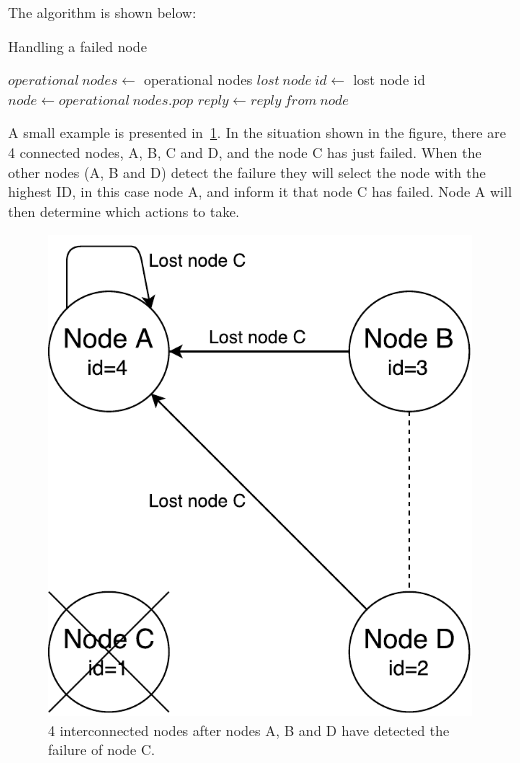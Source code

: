 \documentclass{cslthse-msc}
\begin{document}
The algorithm is shown below:

\begin{algorithm}[!h]	%
	\caption{Handling a failed node} \label{alg:node_failure}
	\begin{algorithmic}[1]
	\State $operational\ nodes\gets $ operational nodes
	\State $lost\ node\ id\gets $ lost node id
	\State
	\Do
		\State $node\gets operational\ nodes.pop$
		\State
		\State $reply\gets reply\ from\ node$
	\end{algorithmic}
\end{algorithm}

A small example is presented in~\cref{fig:handling_node_failure}. In the situation shown in the figure, there are 4 connected nodes, A, B, C and D, and the node C has just failed. When the other nodes (A, B and D) detect the failure they will select the node with the highest ID, in this case node A, and inform it that node C has failed. Node A will then determine which actions to take.

\begin{figure}[!hbt]
\centering
\includegraphics[scale=0.5]{images/handling_node_failure.pdf}
\caption[Handling a node failure]{4 interconnected nodes after nodes A, B and D have detected the failure of node C.}\label{fig:handling_node_failure}
\end{figure}
\end{document}
